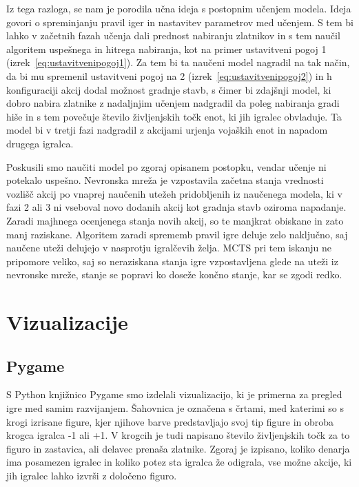 \documentclass[a4paper, 12pt]{book}
\begin{document}
Iz tega razloga, se nam je porodila učna ideja s postopnim učenjem modela. 
Ideja govori o spreminjanju pravil iger in nastavitev parametrov med učenjem.
S tem bi lahko v začetnih fazah učenja dali prednost nabiranju zlatnikov in s tem naučil algoritem uspešnega in hitrega nabiranja, kot na primer ustavitveni pogoj 1 (izrek~\ref{eq:ustavitvenipogoj1}).
Za tem bi ta naučeni model nagradil na tak način, da bi mu spremenil ustavitveni pogoj na 2 (izrek~\ref{eq:ustavitvenipogoj2}) in h konfiguraciji akcij dodal možnost gradnje stavb, s čimer bi zdajšnji model, ki dobro nabira zlatnike z nadaljnjim učenjem nadgradil da poleg nabiranja gradi hiše in s tem povečuje število življenjskih točk enot, ki jih igralec obvladuje.
Ta model bi v tretji fazi nadgradil z akcijami urjenja vojaških enot in napadom drugega igralca.

Poskusili smo naučiti model po zgoraj opisanem postopku, vendar učenje ni potekalo uspešno.
Nevronska mreža je vzpostavila začetna stanja vrednosti vozlišč akcij po vnaprej naučenih utežeh pridobljenih iz naučenega modela, ki v fazi 2 ali 3 ni vseboval novo dodanih akcij kot gradnja stavb oziroma napadanje.
Zaradi majhnega ocenjenega stanja novih akcij, so te manjkrat obiskane in zato manj raziskane.
Algoritem zaradi sprememb pravil igre deluje zelo naključno, saj naučene uteži delujejo v nasprotju igralčevih želja.
MCTS pri tem iskanju ne pripomore veliko, saj so neraziskana stanja igre vzpostavljena glede na uteži iz nevronske mreže, stanje se popravi ko doseže končno stanje, kar se zgodi redko.


\chapter{Vizualizacije}
\label{chvizualizacija}

\section{Pygame}
S Python knjižnico Pygame smo izdelali vizualizacijo, ki je primerna za pregled igre med samim razvijanjem. 
Šahovnica je označena s črtami, med katerimi so s krogi izrisane figure, kjer njihove barve predstavljajo svoj tip figure in obroba krogca igralca -1 ali +1.
V krogcih je tudi napisano število življenjskih točk za to figuro in zastavica, ali delavec prenaša zlatnike.
Zgoraj je izpisano, koliko denarja ima posamezen igralec in koliko potez sta igralca že odigrala, vse možne akcije, ki jih igralec lahko izvrši z določeno figuro.
\end{document}
